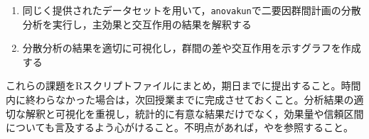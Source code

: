 \begin{enumerate}
\item 同じく提供されたデータセットを用いて，\verb|anovakun|で二要因群間計画の分散分析を実行し，主効果と交互作用の結果を解釈する
\item 分散分析の結果を適切に可視化し，群間の差や交互作用を示すグラフを作成する
\end{enumerate}

これらの課題をRスクリプトファイルにまとめ，期日までに提出すること。時間内に終わらなかった場合は，次回授業までに完成させておくこと。分析結果の適切な解釈と可視化を重視し，統計的に有意な結果だけでなく，効果量や信頼区間についても言及するよう心がけること。不明点があれば，\textcite{kosugi2019}や\textcite{Hashimoto201607}を参照すること。 